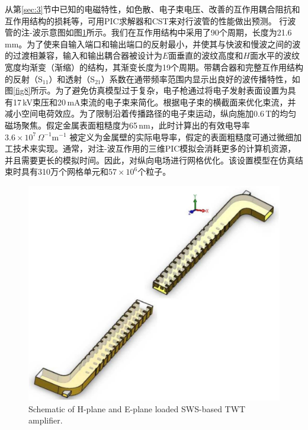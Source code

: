 \documentclass[10pt,a4paper,UTF8]{ctexart}
\begin{document}
从第\ref{sec:3}节中已知的电磁特性，如色散、电子束电压、改善的互作用耦合阻抗和互作用结构的损耗等，可用PIC求解器和CST来对行波管的性能做出预测。 行波管的注-波示意图如图\ref{fig7}所示。我们在互作用结构中采用了90个周期，长度为21.6\,mm。为了使来自输入端口和输出端口的反射最小，并使其与快波和慢波之间的波的过渡相兼容，输入和输出耦合器被设计为$E$面垂直的波纹高度和$H$面水平的波纹宽度均渐变（渐缩）的结构，其渐变长度为19个周期。带耦合器和完整互作用结构的反射（S$ _{11} $）和透射（S$ _{21} $）系数在通带频率范围内显示出良好的波传播特性，如图\ref{fig8}所示。为了避免仿真模型过于复杂，电子枪通过将电子发射表面设置为具有17\,kV束压和20\,mA束流的电子束来简化。根据电子束的横截面来优化束流，并减小空间电荷效应。为了限制沿着传播路径的电子束运动，纵向施加0.6\,T的均匀磁场聚焦。假定金属表面粗糙度为65\,nm，此时计算出的有效电导率$ 3.6\times 10^7\,\Omega^{-1}\mathrm{m}^{-1} $ 被定义为金属壁的实际电导率，假定的表面粗糙度可通过微细加工技术来实现。通常，对注-波互作用的三维PIC模拟会消耗更多的计算机资源，并且需要更长的模拟时间。因此，对纵向电场进行网格优化。该设置模型在仿真结束时具有310万个网格单元和$ 57\times 10^6 $个粒子。

\begin{figure}[phtb]
	\centering
	\includegraphics[width=0.95\linewidth]{figure/fig7}
	\caption{Schematic of H-plane and E-plane loaded SWS-based TWT amplifier.}
	\label{fig7}
\end{figure}
\end{document}
